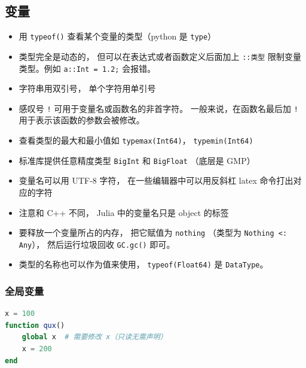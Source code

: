 \subsection{变量}
\begin{itemize}
\item 用 \verb`typeof()` 查看某个变量的类型（python 是 \verb`type`）
\item 类型完全是动态的， 但可以在表达式或者函数定义后面加上 \verb`::类型` 限制变量类型。例如 \verb`a::Int = 1.2;` 会报错。
\item 字符串用双引号， 单个字符用单引号
\item 感叹号 \verb`!` 可用于变量名或函数名的非首字符。 一般来说，在函数名最后加 \verb`!` 用于表示该函数的参数会被修改。
\item 查看类型的最大和最小值如 \verb`typemax(Int64)`， \verb`typemin(Int64)`
\item 标准库提供任意精度类型 \verb`BigInt` 和 \verb`BigFloat` （底层是 GMP）
\item 变量名可以用 UTF-8 字符， 在一些编辑器中可以用反斜杠 latex 命令打出对应的字符
\item 注意和 C++ 不同， Julia 中的变量名只是 object 的标签
\item 要释放一个变量所占的内存， 把它赋值为 \verb`nothing` （类型为 \verb`Nothing <: Any`）， 然后运行垃圾回收 \verb`GC.gc()` 即可。
\item 类型的名称也可以作为值来使用， \verb`typeof(Float64)` 是 \verb`DataType`。
\end{itemize}

\subsubsection{全局变量}
\begin{lstlisting}[language=julia]
x = 100
function qux()
    global x  # 需要修改 x（只读无需声明）
    x = 200
end
\end{lstlisting}

